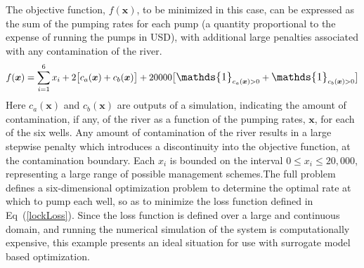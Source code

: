 \documentclass{article}
\def \oner {
        \mathlarger{\mathds{1}}
}
\begin{document}
%
The objective function, $f(\bm{x})$, to be minimized in this case, can be 
expressed as the sum of the pumping rates for each pump (a quantity 
proportional to the expense of running the pumps in USD), with additional 
large penalties associated with any contamination of the river. 
\begin{equation}
f(\bm{x}) = \sum_{i=1}^6 x_i +  2\big[ c_a(\bm{x}) + c_b(\bm{x}) \big] + 20000 \big[ \oner_{c_a(\bm{x})>0} + \oner_{c_b(\bm{x})>0} \big] 
\label{lockLoss}
\end{equation}
Here $c_a(\bm{x})$ and $c_b(\bm{x})$ are outputs of a simulation, indicating 
the amount of contamination, if any, of the river as a function of the pumping 
rates, $\bm{x}$, for each of the six wells. Any amount of contamination of the 
river results in a large stepwise penalty which introduces a discontinuity 
into the objective function, at the contamination boundary. Each $x_i$ is 
bounded on the interval \mbox{$0\le x_i\le20,000$}, representing a large range 
of possible management schemes.The full problem defines a six-dimensional 
optimization problem to determine the optimal rate at which to pump each well, 
so as to minimize the loss function defined in Eq~(\ref{lockLoss}). Since the 
loss function is defined over a large and continuous domain, and running the 
numerical simulation of the system is computationally expensive, this example 
presents an ideal situation for use with surrogate model based optimization. 

%


% 
%
\end{document}
